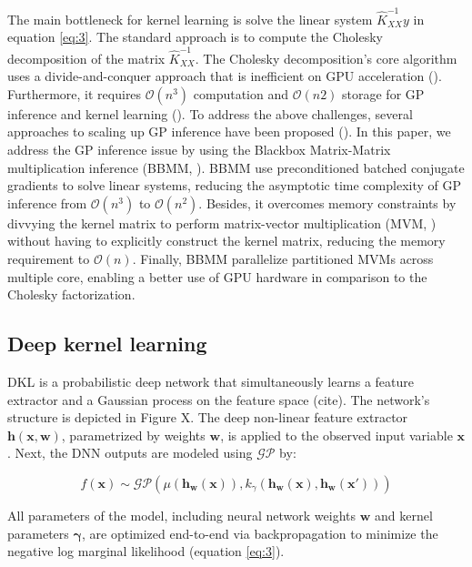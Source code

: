 \documentclass[a4paper, nobind]{templates/cdethesis}
\begin{document}
The main bottleneck for kernel learning is solve the linear system \(\widehat{K}_{XX}^{-1}y\) in equation \ref{eq:3}. The standard approach is to compute the Cholesky decomposition of the matrix \(\widehat{K}_{XX}^{-1}\). The Cholesky decomposition's core algorithm
uses a divide-and-conquer approach that is inefficient on GPU acceleration (\cite{krishnamoorthy2013matrix}). Furthermore, it requires \(\mathcal{O}(n^{3})\) computation and \(\mathcal{O}(n2)\) storage for GP inference and kernel learning (\cite{rasmussen2003gaussian}). To address the above challenges, several approaches to scaling up GP inference have been proposed (\cite{gardner2018gpytorch, cunningham2008fast, dong2017scalable, bach2013sharp, wilson2015thoughts}). In this paper, we address the GP inference issue by using the Blackbox Matrix-Matrix multiplication inference (BBMM, \cite{gardner2018gpytorch}). BBMM use preconditioned batched conjugate gradients to solve linear systems, reducing the asymptotic time complexity of GP inference from \(\mathcal{O}(n^{3})\) to \(\mathcal{O}(n^{2})\). Besides, it overcomes memory constraints by divvying the kernel matrix to perform matrix-vector multiplication (MVM, \cite{demmel1997applied}) without having to explicitly construct the kernel matrix, reducing the memory requirement to \(\mathcal{O}(n)\). Finally, BBMM parallelize partitioned MVMs across multiple core, enabling a better use of GPU hardware in comparison to the Cholesky factorization.

\hypertarget{deep-kernel-learning}{%
\subsection{Deep kernel learning}\label{deep-kernel-learning}}

DKL is a probabilistic deep network that simultaneously learns a feature
extractor and a Gaussian process on the feature space (cite). The network's
structure is depicted in Figure X. The deep non-linear feature extractor
\(\mathbf{h(x,w)}\), parametrized by weights \(\mathbf{w}\), is applied to the
observed input variable \(\mathbf{x}\). Next, the DNN outputs are modeled using
\(\mathcal{GP}\) by:

\begin{equation}
f(\mathbf{x}) \sim \mathcal{GP}(
    \mu(\mathbf{h_w(x)}),
    k_{\gamma}(\mathbf{h_w(x)}, \mathbf{h_w({x}')})
)
\end{equation}

All parameters of the model, including neural network weights \(\mathbf{w}\) and kernel parameters \(\mathbf{\gamma}\), are optimized end-to-end via backpropagation to minimize the
negative log marginal likelihood (equation \ref{eq:3}).
\end{document}
